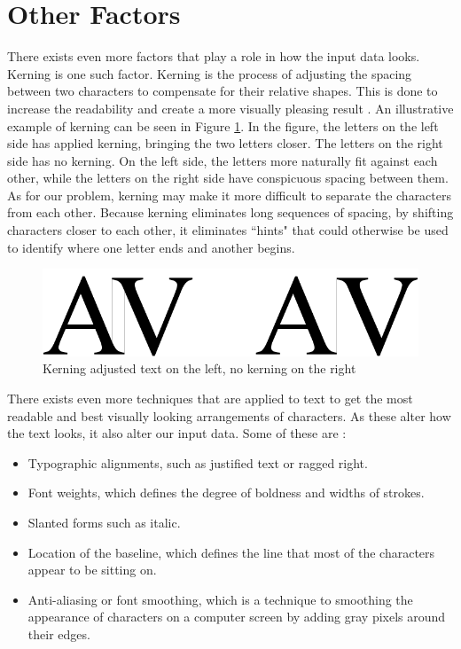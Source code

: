 
\section{Other Factors}
\label{sec:other_factors}
There exists even more factors that play a role in how the input data looks. Kerning is one such factor. Kerning is the process of adjusting the spacing between two characters to compensate for their relative shapes. This is done to increase the readability and create a more visually pleasing result \citep{felici2011complete}. An illustrative example of kerning can be seen in Figure \ref{fig:kerning-comparison}. In the figure, the letters on the left side has applied kerning, bringing the two letters closer. The letters on the right side has no kerning. On the left side, the letters more naturally fit against each other, while the letters on the right side have conspicuous spacing between them. As for our problem, kerning may make it more difficult to separate the characters from each other. Because kerning eliminates long sequences of spacing, by shifting characters closer to each other, it eliminates ``hints" that could otherwise be used to identify where one letter ends and another begins.

\begin{figure}[ht]
    \centering
    \includegraphics[width=1.0\textwidth]{fig/chapter2/kerning.png}
    \caption{Kerning adjusted text on the left, no kerning on the right}
    \label{fig:kerning-comparison}
\end{figure}

\newpage
There exists even more techniques that are applied to text to get the most readable and best visually looking arrangements of characters. As these alter how the text looks, it also alter our input data. Some of these are \citep{felici2011complete}:

\begin{itemize}
    \item Typographic alignments, such as justified text or ragged right.
    \item Font weights, which defines the degree of boldness and widths of strokes.
    \item Slanted forms such as italic.
    \item Location of the baseline, which defines the line that most of the characters appear to be sitting on.
    \item Anti-aliasing or font smoothing, which is a technique to smoothing the appearance of characters on a computer screen by adding gray pixels around their edges.
\end{itemize}


